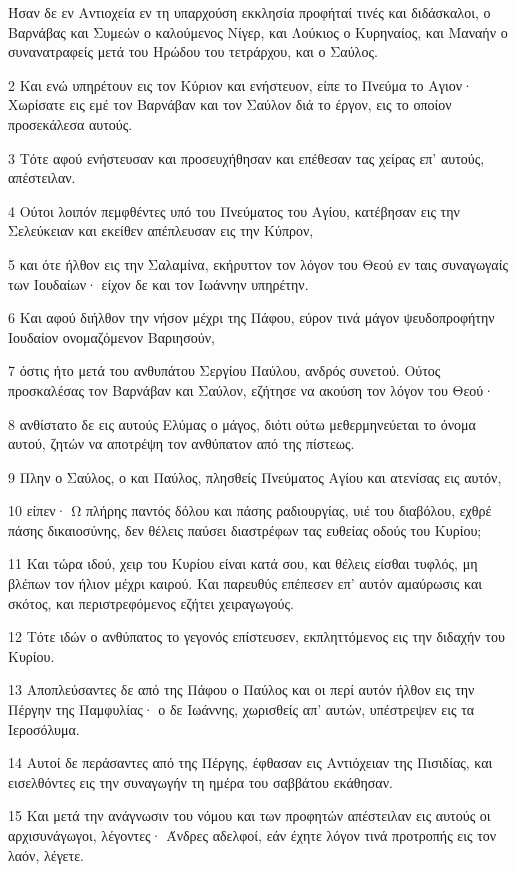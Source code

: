 \par Ήσαν δε εν Αντιοχεία εν τη υπαρχούση εκκλησία προφήταί τινές και διδάσκαλοι, ο Βαρνάβας και Συμεών ο καλούμενος Νίγερ, και Λούκιος ο Κυρηναίος, και Μαναήν ο συνανατραφείς μετά του Ηρώδου του τετράρχου, και ο Σαύλος.
\par 2 Και ενώ υπηρέτουν εις τον Κύριον και ενήστευον, είπε το Πνεύμα το Αγιον· Χωρίσατε εις εμέ τον Βαρνάβαν και τον Σαύλον διά το έργον, εις το οποίον προσεκάλεσα αυτούς.
\par 3 Τότε αφού ενήστευσαν και προσευχήθησαν και επέθεσαν τας χείρας επ' αυτούς, απέστειλαν.
\par 4 Ούτοι λοιπόν πεμφθέντες υπό του Πνεύματος του Αγίου, κατέβησαν εις την Σελεύκειαν και εκείθεν απέπλευσαν εις την Κύπρον,
\par 5 και ότε ήλθον εις την Σαλαμίνα, εκήρυττον τον λόγον του Θεού εν ταις συναγωγαίς των Ιουδαίων· είχον δε και τον Ιωάννην υπηρέτην.
\par 6 Και αφού διήλθον την νήσον μέχρι της Πάφου, εύρον τινά μάγον ψευδοπροφήτην Ιουδαίον ονομαζόμενον Βαριησούν,
\par 7 όστις ήτο μετά του ανθυπάτου Σεργίου Παύλου, ανδρός συνετού. Ούτος προσκαλέσας τον Βαρνάβαν και Σαύλον, εζήτησε να ακούση τον λόγον του Θεού·
\par 8 ανθίστατο δε εις αυτούς Ελύμας ο μάγος, διότι ούτω μεθερμηνεύεται το όνομα αυτού, ζητών να αποτρέψη τον ανθύπατον από της πίστεως.
\par 9 Πλην ο Σαύλος, ο και Παύλος, πλησθείς Πνεύματος Αγίου και ατενίσας εις αυτόν,
\par 10 είπεν· Ω πλήρης παντός δόλου και πάσης ραδιουργίας, υιέ του διαβόλου, εχθρέ πάσης δικαιοσύνης, δεν θέλεις παύσει διαστρέφων τας ευθείας οδούς του Κυρίου;
\par 11 Και τώρα ιδού, χειρ του Κυρίου είναι κατά σου, και θέλεις είσθαι τυφλός, μη βλέπων τον ήλιον μέχρι καιρού. Και παρευθύς επέπεσεν επ' αυτόν αμαύρωσις και σκότος, και περιστρεφόμενος εζήτει χειραγωγούς.
\par 12 Τότε ιδών ο ανθύπατος το γεγονός επίστευσεν, εκπληττόμενος εις την διδαχήν του Κυρίου.
\par 13 Αποπλεύσαντες δε από της Πάφου ο Παύλος και οι περί αυτόν ήλθον εις την Πέργην της Παμφυλίας· ο δε Ιωάννης, χωρισθείς απ' αυτών, υπέστρεψεν εις τα Ιεροσόλυμα.
\par 14 Αυτοί δε περάσαντες από της Πέργης, έφθασαν εις Αντιόχειαν της Πισιδίας, και εισελθόντες εις την συναγωγήν τη ημέρα του σαββάτου εκάθησαν.
\par 15 Και μετά την ανάγνωσιν του νόμου και των προφητών απέστειλαν εις αυτούς οι αρχισυνάγωγοι, λέγοντες· Άνδρες αδελφοί, εάν έχητε λόγον τινά προτροπής εις τον λαόν, λέγετε.
